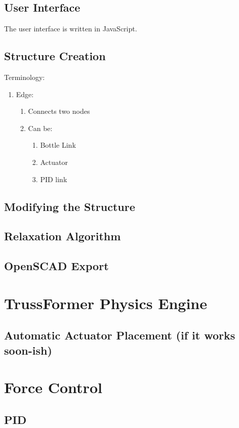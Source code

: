 \subsection{User Interface}
The user interface is written in JavaScript.

\subsection{Structure Creation}
Terminology:\\
\begin{enumerate}
    \item Edge:
    \begin{enumerate}
        \item Connects two nodes
        \item Can be:
        \begin{enumerate}
            \item Bottle Link
            \item Actuator
            \item PID link
        \end{enumerate}
    \end{enumerate}
\end{enumerate}

\subsection{Modifying the Structure}

\subsection{Relaxation Algorithm}\label{sec:relaxation}

\subsection{OpenSCAD Export}\label{sec:openscad_impl}

\section{TrussFormer Physics Engine}

\subsection{Automatic Actuator Placement (if it works soon-ish)}

\section{Force Control}

\subsection{PID}
